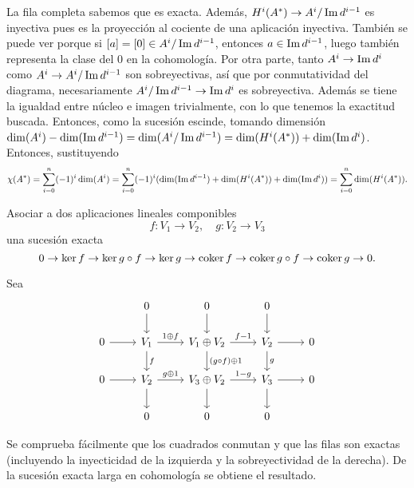 \documentclass[twoside]{article}
\begin{document}
\begin{solucion}
La fila completa sabemos que es exacta.  Además, $H^i(A^*)\to A^i/ \operatorname{Im}{d^{i-1}}$ es inyectiva pues es la proyección al cociente de una aplicación inyectiva. También se puede ver porque si $[a]=[0]\in  A^i/ \operatorname{Im}{d^{i-1}}$, entonces $a\in  \operatorname{Im}{d^{i-1}}$, luego también representa la clase del 0 en la cohomología. Por otra parte, tanto $A^i\to \operatorname{Im}{d^{i}}$ como $A^i\to A^i/ \operatorname{Im}{d^{i-1}}$ son sobreyectivas, así que por conmutatividad del diagrama, necesariamente $ A^i/ \operatorname{Im}{d^{i-1}}\to \operatorname{Im}{d^{i}}$ es sobreyectiva. Además se tiene la igualdad entre núcleo e imagen trivialmente, con lo que tenemos la exactitud buscada. Entonces, como la sucesión escinde, tomando dimensión $\dim(A^i)-\dim(\operatorname{Im}{d^{i-1}})=\dim(A^i/\operatorname{Im}{d^{i-1}})=\dim(H^i(A^ *))+\dim(\operatorname{Im}{d^i})$. Entonces, sustituyendo 
\[
\chi(A^*)=\sum_{i=0}^n(-1)^i\dim(A^i)=\sum_{i=0}^n(-1)^i(\dim(\operatorname{Im}{d^{i-1}})+\dim(H^i(A^*))+\dim(\operatorname{Im}{d^i}))=\sum_{i=0}^n\dim(H^i(A^*)).
\]
\end{solucion}

\newpage

\begin{ejercicio}{4.5}
Asociar a dos aplicaciones lineales componibles 
\[
f:V_1\to V_2,\quad g:V_2\to V_3
\]
una sucesión exacta
\[
0\to \ker{f}\to\ker{g\circ f}\to\ker{g}\to\operatorname{coker}{f}\to\operatorname{coker}{g\circ f}\to\operatorname{coker}{g}\to 0.
\]
\end{ejercicio}
\begin{solucion}
Sea
\[
\begin{tikzcd}
& 0\arrow[d] & 0 \arrow[d] & 0\arrow[d]&\\
0\arrow[r] & V_1\arrow[d,"f"]\arrow[r,"1\oplus f"] & V_1\oplus V_2\arrow[r, "f-1"] \arrow[d, "(g\circ f)\oplus 1"]& V_2 \arrow[d,"g"]\arrow[r] & 0\\
0\arrow[r] &V_2\arrow[d]\arrow[r, "g\oplus 1"]& V_3\oplus V_2\arrow[d] \arrow[r, "1-g"]& V_3\arrow[d]\arrow[r] & 0\\
& 0 & 0 & 0 &
\end{tikzcd}
\]

Se comprueba fácilmente que los cuadrados conmutan y que las filas son exactas (incluyendo la inyecticidad de la izquierda y la sobreyectividad de la derecha). De la sucesión exacta larga en cohomología se obtiene el resultado.
\end{solucion}
\end{document}

